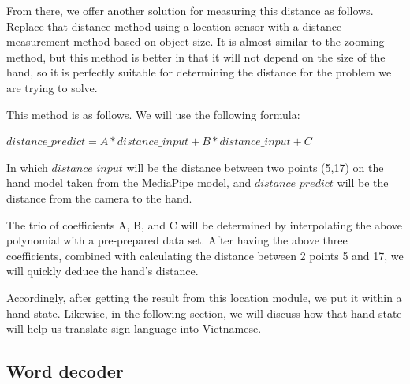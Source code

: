 From there, we offer another solution for measuring this distance as follows. Replace that distance method using a location sensor with a distance measurement method based on object size. It is almost similar to the zooming method, but this method is better in that it will not depend on the size of the hand, so it is perfectly suitable for determining the distance for the problem we are trying to solve.

This method is as follows. We will use the following formula:
\begin{center}
  $ distance\_predict = A*distance\_input + B*distance\_input + C $ 
\end{center}

In which $distance\_input$ will be the distance between two points (5,17) on the hand model taken from the MediaPipe model, and $distance\_predict$ will be the distance from the camera to the hand.

The trio of coefficients A, B, and C will be determined by interpolating the above polynomial with a pre-prepared data set. After having the above three coefficients, combined with calculating the distance between 2 points 5 and 17, we will quickly deduce the hand's distance.

Accordingly, after getting the result from this location module, we put it within a hand state. Likewise, in the following section, we will discuss how that hand state will help us translate sign language into Vietnamese.

  
  

  





\subsection{Word decoder}

